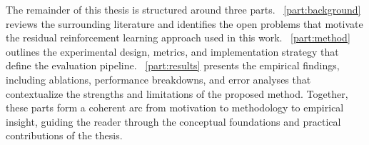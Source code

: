 The remainder of this thesis is structured around three parts. ~\cref{part:background} reviews the surrounding literature and identifies the open problems that motivate the residual reinforcement learning approach used in this work. ~\cref{part:method} outlines the experimental design, metrics, and implementation strategy that define the evaluation pipeline. ~\cref{part:results} presents the empirical findings, including ablations, performance breakdowns, and error analyses that contextualize the strengths and limitations of the proposed method. Together, these parts form a coherent arc from motivation to methodology to empirical insight, guiding the reader through the conceptual foundations and practical contributions of the thesis.
